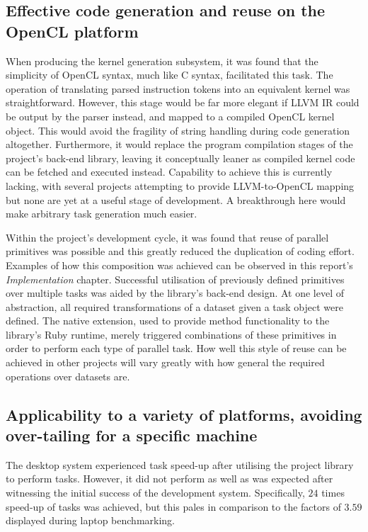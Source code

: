 \subsection{Effective code generation and reuse on the OpenCL platform}
When producing the kernel generation subsystem, it was found that the simplicity of \ac{OpenCL} syntax, much like C syntax, facilitated this task. The operation of translating parsed instruction tokens into an equivalent kernel was straightforward. However, this stage would be far more elegant if LLVM \ac{IR} could be output by the parser instead, and mapped to a compiled \ac{OpenCL} kernel object. This would avoid the fragility of string handling during code generation altogether. Furthermore, it would replace the program compilation stages of the project's back-end library, leaving it conceptually leaner as compiled kernel code can be fetched and executed instead. Capability to achieve this is currently lacking, with several projects attempting to provide LLVM-to-\ac{OpenCL} mapping but none are yet at a useful stage of development. A breakthrough here would make arbitrary task generation much easier.

Within the project's development cycle, it was found that reuse of parallel primitives was possible and this greatly reduced the duplication of coding effort. Examples of how this composition was achieved can be observed in this report's \emph{Implementation} chapter. Successful utilisation of previously defined primitives over multiple tasks was aided by the library's back-end design. At one level of abstraction, all required transformations of a dataset given a task object were defined. The native extension, used to provide method functionality to the library's Ruby runtime, merely triggered combinations of these primitives in order to perform each type of parallel task. How well this style of reuse can be achieved in other projects will vary greatly with how general the required operations over datasets are.


\subsection{Applicability to a variety of platforms, avoiding over-tailing for a specific machine}
The desktop system experienced task speed-up after utilising the project library to perform tasks. However, it did not perform as well as was expected after witnessing the initial success of the development system. Specifically, $2$\textendash$4$ times speed-up of tasks was achieved, but this pales in comparison to the factors of $3.5$\textendash$9$ displayed during laptop benchmarking.

